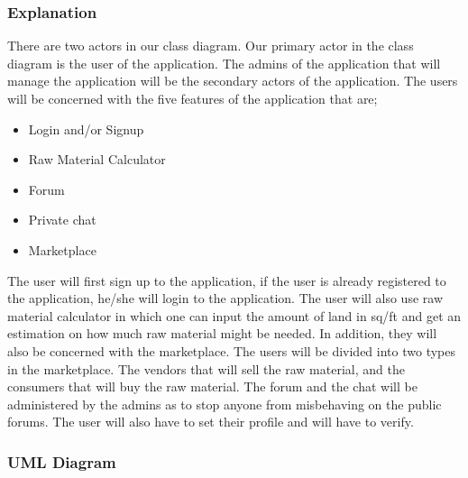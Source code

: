 \documentclass{article}
\begin{document}
\subsubsection*{Explanation}

There are two actors in our class diagram. Our primary actor in the class
diagram is the user of the application. The admins of the application that will
manage the application will be the secondary actors of the application. The
users will be concerned with the five features of the application that are;

\begin{itemize}
      \item Login and/or Signup
      \item Raw Material Calculator
      \item Forum
      \item Private chat
      \item Marketplace
\end{itemize}

The user will first sign up to the application, if the user is already
registered to the application, he/she will login to the application. The user
will also use raw material calculator in which one can input the amount of land
in sq/ft and get an estimation on how much raw material might be needed. In
addition, they will also be concerned with the marketplace. The users will be
divided into two types in the marketplace. The vendors that will sell the raw
material, and the consumers that will buy the raw material. The forum and the
chat will be administered by the admins as to stop anyone from misbehaving on
the public forums. The user will also have to set their profile and will have
to verify.

\newpage

\subsubsection*{UML Diagram}
\end{document}
